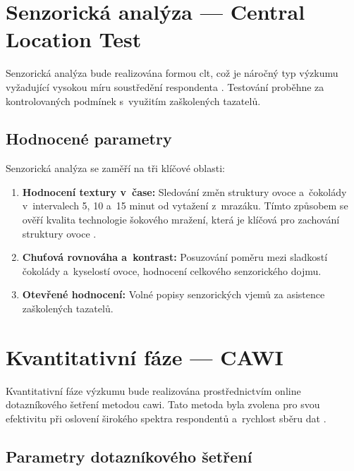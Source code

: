 \section{Senzorická analýza — Central Location Test}
\label{sec:meth_clt}

Senzorická analýza bude realizována formou \gls{clt}, což je náročný typ výzkumu vyžadující vysokou míru soustředění respondenta \parencite{lawless_heymann_2010}. Testování proběhne za kontrolovaných podmínek s~využitím zaškolených tazatelů.

\subsection{Hodnocené parametry}

Senzorická analýza se zaměří na tři klíčové oblasti:

\begin{enumerate}
  \item \textbf{Hodnocení textury v~čase:} Sledování změn struktury ovoce a~čokolády v~intervalech 5, 10 a~15 minut od vytažení z~mrazáku. Tímto způsobem se ověří kvalita technologie šokového mražení, která je klíčová pro zachování struktury ovoce \parencite{grover_negi_2023}.
  \item \textbf{Chuťová rovnováha a~kontrast:} Posuzování poměru mezi sladkostí čokolády a~kyselostí ovoce, hodnocení celkového senzorického dojmu.
  \item \textbf{Otevřené hodnocení:} Volné popisy senzorických vjemů za asistence zaškolených tazatelů.
\end{enumerate}

\section{Kvantitativní fáze — CAWI}
\label{sec:meth_cawi}

Kvantitativní fáze výzkumu bude realizována prostřednictvím online dotazníkového šetření metodou \gls{cawi}. Tato metoda byla zvolena pro svou efektivitu při oslovení širokého spektra respondentů a~rychlost sběru dat \parencite{punch_2014}.

\subsection{Parametry dotazníkového šetření}

